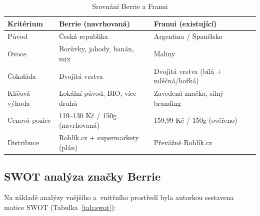 \begin{table}[H]
\centering
\caption{Srovnání Berrie a Franui}
\label{tab:comparison}
\begin{tabularx}{\textwidth}{lXX}
\toprule
\textbf{Kritérium} & \textbf{Berrie (navrhovaná)} & \textbf{Franui (existující)} \\
\midrule
Původ & Česká republika & Argentina / Španělsko \\
Ovoce & Borůvky, jahody, banán, mix & Maliny \\
Čokoláda & Dvojitá vrstva & Dvojitá vrstva (bílá + mléčná/hořká) \\
Klíčová výhoda & Lokální původ, BIO, více druhů & Zavedená značka, silný branding \\
Cenová pozice & 119--130 Kč / 150g (navrhovaná) & 159,99 Kč / 150g (ověřeno) \\
Distribuce & Rohlík.cz + supermarkety (plán) & Převážně Rohlík.cz \\
\bottomrule
\end{tabularx}
\end{table}

\subsection{SWOT analýza značky Berrie}

Na základě analýzy vnějšího a~vnitřního prostředí byla autorkou sestavena matice SWOT (Tabulka~\ref{tab:swot}):

